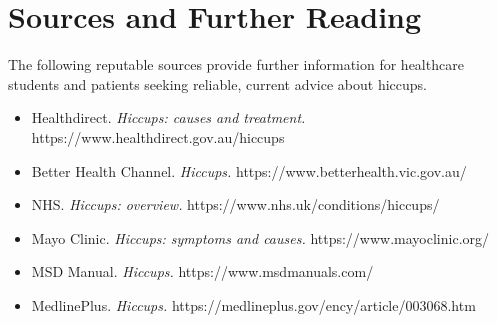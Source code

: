 \section*{Sources and Further Reading}
The following reputable sources provide further information for healthcare students and patients seeking reliable, current advice about hiccups.

\begin{itemize}
    \item Healthdirect. \textit{Hiccups: causes and treatment.} https://www.healthdirect.gov.au/hiccups
    \item Better Health Channel. \textit{Hiccups.} https://www.betterhealth.vic.gov.au/
    \item NHS. \textit{Hiccups: overview.} https://www.nhs.uk/conditions/hiccups/
    \item Mayo Clinic. \textit{Hiccups: symptoms and causes.} https://www.mayoclinic.org/
    \item MSD Manual. \textit{Hiccups.} https://www.msdmanuals.com/
    \item MedlinePlus. \textit{Hiccups.} https://medlineplus.gov/ency/article/003068.htm
\end{itemize}

